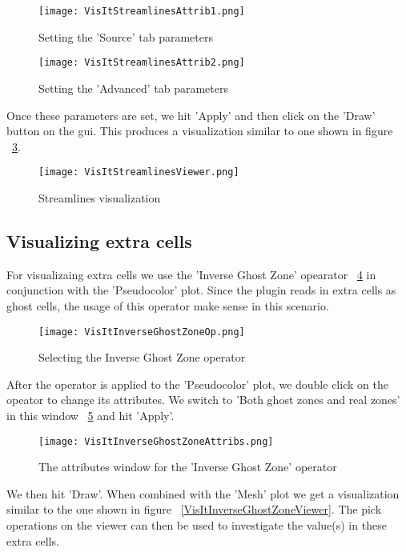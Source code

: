 \begin{figure}
  \center
  \texttt{[image: VisItStreamlinesAttrib1.png]}
  \caption{Setting the 'Source' tab parameters}
  \label{VisItStreamlinesAttrib1}
\end{figure}

\begin{figure}
  \center
  \texttt{[image: VisItStreamlinesAttrib2.png]}
  \caption{Setting the 'Advanced' tab parameters}
  \label{VisItStreamlinesAttrib2}
\end{figure}

Once these parameters are set, we hit 'Apply' and then click on the 'Draw' button on the gui. This produces a visualization similar to one shown in figure ~\ref{VisItStreamlinesViewer}.

\begin{figure}
  \center
  \texttt{[image: VisItStreamlinesViewer.png]}
  \caption{Streamlines visualization}
  \label{VisItStreamlinesViewer}
\end{figure}

\subsection{Visualizing extra cells}

For visualizaing extra cells we use the 'Inverse Ghost Zone' opearator ~\ref{VisItInverseGhostZoneOp} in conjunction with the 'Pseudocolor' plot. Since the plugin reads in extra cells as ghost cells, the usage of this operator make sense in this scenario.  

\begin{figure}
  \center
  \texttt{[image: VisItInverseGhostZoneOp.png]}
  \caption{Selecting the Inverse Ghost Zone operator}
  \label{VisItInverseGhostZoneOp}
\end{figure}

After the operator is applied to the 'Pseudocolor' plot, we double click on the opeator to change its attributes. We switch to 'Both ghost zones and real zones' in this window ~\ref{VisItInverseGhostZoneAttribs} and hit 'Apply'.

\begin{figure}
  \center
  \texttt{[image: VisItInverseGhostZoneAttribs.png]}
  \caption{The attributes window for the 'Inverse Ghost Zone' operator}
  \label{VisItInverseGhostZoneAttribs}
\end{figure}

We then hit 'Draw'. When combined with the 'Mesh' plot we get a visualization similar to the one shown in figure ~\ref{VisItInverseGhostZoneViewer}. The pick operations on the viewer can then be used to investigate the value(s) in these extra cells. 


